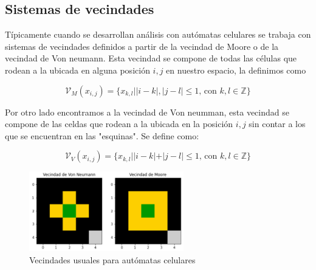 \subsection{Sistemas de vecindades}

Típicamente cuando se desarrollan análisis con autómatas celulares se trabaja con sistemas de vecindades definidos a partir de la vecindad de Moore o de la vecindad de Von neumann. Esta vecindad se compone de todas las células que rodean a la ubicada en alguna posición $i,j$ en nuestro espacio, la definimos como 

$$\mathcal{V}_M(x_{i,j}) = \{x_{k,l}||i-k|,|j-l|\leq1\text{, con }k,l\in\mathbb{Z}\}$$

Por otro lado encontramos a la vecindad de Von neumman, esta vecindad se compone de las celdas que rodean a la ubicada en la posición $i,j$ sin contar a los que se encuentran en las "esquinas". Se define como:

$$\mathcal{V}_V(x_{i,j}) = \{x_{k,l}||i-k|+|j-l|\leq1\text{, con }k,l\in\mathbb{Z}\}$$

\begin{figure}[h]
  \centering
    \includegraphics[width=0.6\textwidth]{Imagenes/vecindades.PNG}
  \caption{Vecindades usuales para autómatas celulares}
  \label{fig:Moore - Von neumann}
\end{figure}


